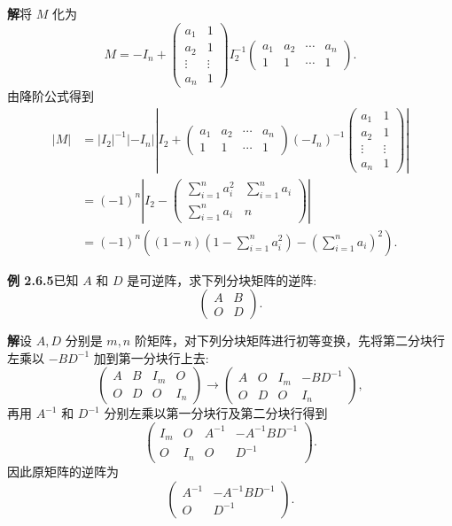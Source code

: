 \documentclass[UTF8, 12pt, fontset=fandol, oneside]{ctexart}
\begin{document}
\noindent\textbf{解}\quad 将 $M$ 化为
\[
M=-I_n+
\left(\begin{array}{cc}
a_1 & 1\\
a_2 & 1\\
\vdots & \vdots\\
a_n & 1
\end{array}\right)
I_2^{-1}
\left(\begin{array}{cccc}
a_1 & a_2 & \cdots & a_n\\
1 & 1 & \cdots & 1
\end{array}\right).
\]
由降阶公式得到
\[
\begin{aligned}
|M|
&=|I_2|^{-1}|-I_n|\left|I_2+
\left(\begin{array}{cccc}
a_1 & a_2 & \cdots & a_n\\
1 & 1 & \cdots & 1
\end{array}\right)(-I_n)^{-1}
\left(\begin{array}{cc}
a_1 & 1\\
a_2 & 1\\
\vdots & \vdots\\
a_n & 1
\end{array}\right)\right|\\
&=(-1)^n\left|I_2-
\left(\begin{array}{cc}
\sum\limits_{i=1}^n a_i^2 & \sum\limits_{i=1}^n a_i\\
\sum\limits_{i=1}^n a_i & n
\end{array}\right)\right|\\
&=(-1)^n\left((1-n)\left(1-\sum\limits_{i=1}^n a_i^2\right)-\left(\sum\limits_{i=1}^n a_i\right)^2\right).
\end{aligned}
\]

\noindent\textbf{例 2.6.5}\quad 已知 $A$ 和 $D$ 是可逆阵，求下列分块矩阵的逆阵:
\[
\left(\begin{array}{cc}
A & B\\
O & D
\end{array}\right).
\]

\noindent\textbf{解}\quad 设 $A,D$ 分别是 $m,n$ 阶矩阵，对下列分块矩阵进行初等变换，先将第二分块行左乘以 $-BD^{-1}$ 加到第一分块行上去:
\[
\left(\begin{array}{cc|cc}
A & B & I_m & O\\
O & D & O & I_n
\end{array}\right)\longrightarrow
\left(\begin{array}{cc|cc}
A & O & I_m & -BD^{-1}\\
O & D & O & I_n
\end{array}\right),
\]
再用 $A^{-1}$ 和 $D^{-1}$ 分别左乘以第一分块行及第二分块行得到
\[
\left(\begin{array}{cc|cc}
I_m & O & A^{-1} & -A^{-1}BD^{-1}\\
O & I_n & O & D^{-1}
\end{array}\right).
\]
因此原矩阵的逆阵为
\[
\left(\begin{array}{cc}
A^{-1} & -A^{-1}BD^{-1}\\
O & D^{-1}
\end{array}\right).
\]
\end{document}
